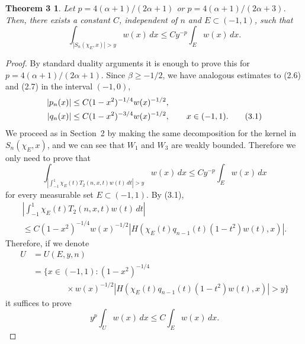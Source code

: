 \documentclass[10pt,a4paper]{article}
\theoremstyle{plain}
\newtheorem*{theoThree}{Theorem 3}
\theoremstyle{remark}
\begin{document}
\begin{theoThree}
Let $p = 4(\alpha+1)/(2\alpha+1)$ or
$p = 4(\alpha+1)/(2\alpha+3)$. Then, there exists a constant
$C$, independent of $n$ and $E \subset (-1,1)$, such that
$$
\int_{|S_{n}(\chi_{E},x)| > y} w(x)\,dx
\leq Cy^{-p} \int_{E} w(x)\,dx.
$$
\end{theoThree}

\begin{proof}
By standard duality arguments it is enough to prove
this for $p = 4(\alpha+1)/(2\alpha+1)$. Since $\beta \geq -1/2$,
we have analogous estimates to (2.6) and (2.7)
in the interval $(-1,0)$,
\begin{align}
|p_{n}(x)| &\leq C(1-x^{2})^{-1/4} w(x)^{-1/2}, \notag \\
|q_{n}(x)| &\leq C(1-x^{2})^{-3/4} w(x)^{-1/2} ,
\qquad x \in (-1,1).
\tag{3.1}
\end{align}
We proceed as in Section~2 by making the same decomposition for
the kernel in $S_{n}(\chi_{E},x)$, and we can see that $W_{1}$
and $W_{3}$ are weakly bounded. Therefore we only need to prove
that
$$
\int_{\left| \int_{-1}^{1} \chi_{E}(t)T_{2}(n,x,t)w(t)\,dt \right| > y}
w(x)\,dx \leq Cy^{-p} \int_{E} w(x)\,dx
$$
for every measurable set $E \subset (-1,1)$. By (3.1),
\begin{multline*}
\left| \int_{-1}^{1} \chi_{E}(t)T_{2}(n,x,t)w(t)\,dt \right| \\
\leq C(1-x^{2})^{-1/4} w(x)^{-1/2} |H(\chi_{E}(t)q_{n-1}(t)(1-t^{2})w(t),x)|.
\end{multline*}
Therefore, if we denote
\begin{align*}
U &= U(E,y,n) \\
&= \{x \in (-1,1) : (1-x^{2})^{-1/4} \\
&\qquad\qquad\times w(x)^{-1/2}
|H(\chi_{E}(t)q_{n-1}(t)(1-t^{2})w(t),x)| > y\}
\end{align*}
it suffices to prove
$$
y^{p} \int_{U} w(x)\,dx \leq C \int_{E} w(x)\,dx.
$$


\end{proof}
\end{document}
